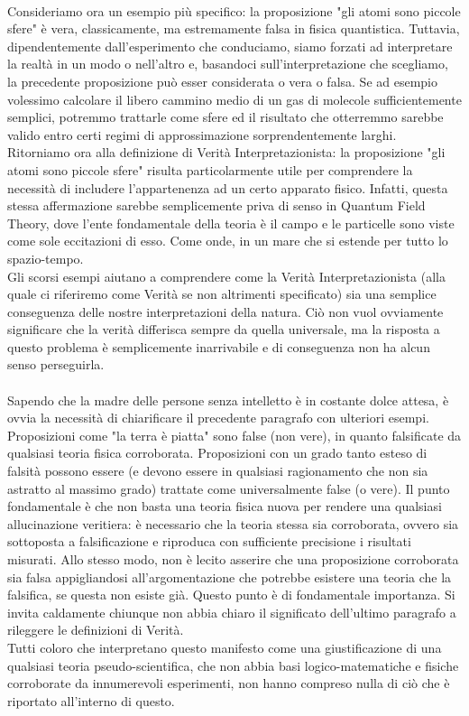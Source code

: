 \documentclass[]{article}
\begin{document}
	\\
	Consideriamo ora un esempio più specifico: la proposizione "gli atomi sono piccole sfere" è vera, classicamente, ma estremamente falsa in fisica quantistica. Tuttavia, dipendentemente dall'esperimento che conduciamo, siamo forzati ad interpretare la realtà in un modo o nell'altro e, basandoci sull'interpretazione che scegliamo, la precedente proposizione può esser considerata o vera o falsa. Se ad esempio volessimo calcolare il libero cammino medio di un gas di molecole sufficientemente semplici, potremmo trattarle come sfere ed il risultato che otterremmo sarebbe valido entro certi regimi di approssimazione sorprendentemente larghi.\\
	Ritorniamo ora alla definizione di Verità Interpretazionista: la proposizione "gli atomi sono piccole sfere" risulta particolarmente utile per comprendere la necessità di includere l'appartenenza ad un certo apparato fisico. Infatti, questa stessa affermazione sarebbe semplicemente priva di senso in Quantum Field Theory, dove l'ente fondamentale della teoria è il campo e le particelle sono viste come sole eccitazioni di esso. Come onde, in un mare che si estende per tutto lo spazio-tempo.\\
	Gli scorsi esempi aiutano a comprendere come la Verità Interpretazionista (alla quale ci riferiremo come Verità se non altrimenti specificato) sia una semplice conseguenza delle nostre interpretazioni della natura. Ciò non vuol ovviamente significare che la verità differisca sempre da quella universale, ma la risposta a questo problema è semplicemente inarrivabile e di conseguenza non ha alcun senso perseguirla.\\
	\\
	Sapendo che la madre delle persone senza intelletto è in costante dolce attesa, è ovvia la necessità di chiarificare il precedente paragrafo con ulteriori esempi. Proposizioni come "la terra è piatta" sono false (non vere), in quanto falsificate da qualsiasi teoria fisica corroborata. Proposizioni con un grado tanto esteso di falsità possono essere (e devono essere in qualsiasi ragionamento che non sia astratto al massimo grado) trattate come universalmente false (o vere).
	Il punto fondamentale è che non basta una teoria fisica nuova per rendere una qualsiasi allucinazione veritiera: è necessario che la teoria stessa sia corroborata, ovvero sia sottoposta a falsificazione e riproduca con sufficiente precisione i risultati misurati. Allo stesso modo, non è lecito asserire che una proposizione corroborata sia falsa appigliandosi all'argomentazione che potrebbe esistere una teoria che la falsifica, se questa non esiste già. Questo punto è di fondamentale importanza.		
	Si invita caldamente chiunque non abbia chiaro il significato dell'ultimo paragrafo a rileggere le definizioni di Verità.\\
	Tutti coloro che interpretano questo manifesto come una giustificazione di una qualsiasi teoria pseudo-scientifica, che non abbia basi logico-matematiche e fisiche corroborate da innumerevoli esperimenti, non hanno compreso nulla di ciò che è riportato all'interno di questo.
\end{document}
